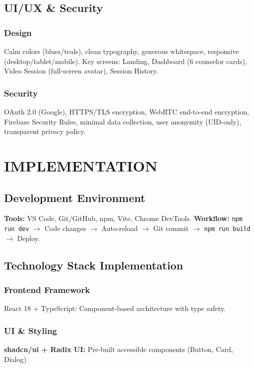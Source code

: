 \documentclass[11pt,a4paper]{report}
\begin{document}
\section{UI/UX \& Security}

\subsection{Design}
Calm colors (blues/teals), clean typography, generous whitespace, responsive (desktop/tablet/mobile). Key screens: Landing, Dashboard (6 counselor cards), Video Session (full-screen avatar), Session History.

\subsection{Security}
OAuth 2.0 (Google), HTTPS/TLS encryption, WebRTC end-to-end encryption, Firebase Security Rules, minimal data collection, user anonymity (UID-only), transparent privacy policy.

\chapter{IMPLEMENTATION}

\section{Development Environment}
\textbf{Tools:} VS Code, Git/GitHub, npm, Vite, Chrome DevTools. \textbf{Workflow:} \texttt{npm run dev} $\rightarrow$ Code changes $\rightarrow$ Auto-reload $\rightarrow$ Git commit $\rightarrow$ \texttt{npm run build} $\rightarrow$ Deploy.

\section{Technology Stack Implementation}

\subsection{Frontend Framework}
React 18 + TypeScript: Component-based architecture with type safety.

\subsection{UI \& Styling}
\textbf{shadcn/ui + Radix UI:} Pre-built accessible components (Button, Card, Dialog)
\end{document}
